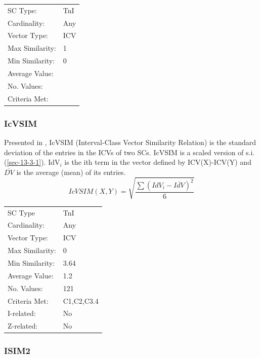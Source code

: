 \documentclass{article}
\begin{document}
\begin{center}
\begin{tabular}{ll}
 SC Type:         &  TnI  \\
 Cardinality:     &  Any  \\
 Vector Type:     &  ICV  \\
 Max Similarity:  &  1    \\
 Min Similarity:  &  0    \\
 Average Value:   &       \\
 No. Values:      &       \\
 Criteria Met:    &       \\
\end{tabular}
\end{center}
\subsubsection{IcVSIM}
\label{sec-13-6-2}

Presented in \citet[pp. 18]{Isaacson1990}, IcVSIM (Interval-Class
Vector Similarity Relation) is the standard deviation of the entries
in the ICVs of two SCs. IcVSIM is a scaled version of
s.i. (\ref{sec-13-3-1}). IdV$_{i}$ is the ith term in the vector defined by
ICV(X)-ICV(Y) and $\overline{DV}$ is the average (mean) of its
entries.
$$IcVSIM(X,Y)=\sqrt{\frac{\sum(IdV_{i}-\overline{IdV})^{2}}{6}}$$

\begin{center}
\begin{tabular}{ll}
 SC Type          &  TnI         \\
 Cardinality:     &  Any         \\
 Vector Type:     &  ICV         \\
 Max Similarity:  &  0           \\
 Min Similarity:  &  3.64        \\
 Average Value:   &  1.2         \\
 No. Values:      &  121         \\
 Criteria Met:    &  C1,C2,C3.4  \\
 I-related:       &  No          \\
 Z-related:       &  No          \\
\end{tabular}
\end{center}
\subsubsection{ISIM2}
\label{sec-13-6-3}
\end{document}
